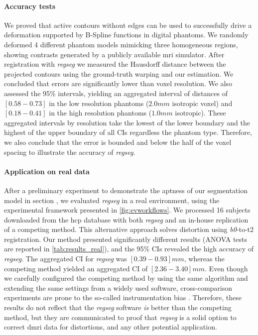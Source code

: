\paragraph*{Accuracy tests}
We proved that active contours without edges can be used to successfully drive a
  deformation supported by B-Spline functions in digital phantoms.
We randomly deformed 4 different phantom models mimicking three homogeneous regions,
  showing contrasts generated by a publicly available \gls*{mri} simulator.
After registration with \emph{regseg} we measured the Hausdorff distance between the
  projected contours using the ground-truth warping and our estimation.
We concluded that errors are significantly lower than voxel resolution.
We also assessed the 95\% intervals, yielding an aggregated interval of distances of
  $[0.58 - 0.73]$ in the low resolution phantoms ($2.0mm$ isotropic voxel) and
  $[0.18 - 0.41]$ in the high resolution phantoms ($1.0mm$ isotropic).
These aggregated intervals by resolution take the lowest of the lower boundary
  and the highest of the upper boundary of all CIs regardless the phantom type.
Therefore, we also conclude that the error is bounded and below the half of the
  voxel spacing to illustrate the accuracy of \emph{regseg}.

\paragraph*{Application on real data}
After a preliminary experiment to demonstrate the aptness of our segmentation model
  in section , we evaluated \emph{regseg} in
  a real environment, using the experimental framework presented in \autoref{fig:evworkflows}.
We processed 16 subjects downloaded from the \gls*{hcp} database with both \emph{regseg}
  and an in-house replication of a competing method.
This alternative approach solves distortion using \emph{b0}-to-\gls*{t2} registration.
Our method presented significantly different results (ANOVA tests are reported in
  \autoref{tab:results_real}), and the 95\% CIs revealed the high accuracy of
  \emph{regseg}.
The aggregated CI for \emph{regseg} was $[0.39 - 0.93] mm$, whereas the competing method
  yielded an aggregated CI of $[2.36 - 3.40] mm$.
Even though we carefully configured the competing method by using the same algorithm and
  extending the same settings from a widely used software, cross-comparison
  experiments are prone to the so-called instrumentation bias \citep{tustison_instrumentation_2013}.
Therefore, these results do not reflect that the \emph{regseg} software \emph{is} better than the
  competing method, but they are communicated to proof that \emph{regseg} is a solid option to
  correct \gls*{dmri} data for distortions, and any other potential application.

